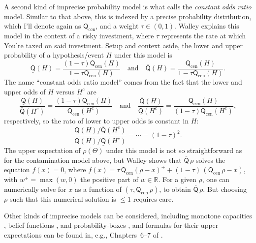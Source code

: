 \documentclass[a4paper, 12pt]{article}
\theoremstyle{plain}
\theoremstyle{definition}
\theoremstyle{remark}
\newcommand{\RR}{\mathbb{R}}
\newcommand{\TT}{\mathbb{T}}
\newcommand{\prior}{\mathsf{Q}}
\newcommand{\lprior}{\underline{\mathsf{Q}}}
\newcommand{\uprior}{\overline{\mathsf{Q}}}
\begin{document}
A second kind of imprecise probability model is what \citet[][Sec.~2.9.4]{walley1991} calls the {\em constant odds ratio} model.  Similar to that above, this is indexed by a precise probability distribution, which I'll denote again as $\prior_\text{cen}$, and a weight $\tau \in (0,1)$.  Walley explains this model in the context of a risky investment, where $\tau$ represents the rate at which You're taxed on said investment.  Setup and context aside, the lower and upper probability of a hypothesis/event $H$ under this model is 
\[ \lprior(H) = \frac{(1-\tau) \prior_\text{cen}(H)}{1 - \tau \prior_\text{cen}(H)} \quad \text{and} \quad \uprior(H) = \frac{\prior_\text{cen}(H)}{1-\tau \prior_\text{cen}(H)}. \]
The name ``constant odds ratio model'' comes from the fact that the lower and upper odds of $H$ versus $H^c$ are 
\[ \frac{\lprior(H)}{\uprior(H^c)} = \frac{(1-\tau) \prior_\text{cen}(H)}{\prior_\text{cen}(H^c)} \quad \text{and} \quad \frac{\uprior(H)}{\lprior(H^c)} = \frac{\prior_\text{cen}(H)}{(1-\tau)\prior_\text{cen}(H^c)}, \]
respectively, so the rato of lower to upper odds is constant in $H$:
\[ \frac{\lprior(H) / \uprior(H^c)}{\uprior(H) / \lprior(H^c)} = \cdots = (1-\tau)^2. \]
The upper expectation of $\rho(\Theta)$ under this model is not so straightforward as for the contamination model above, but Walley shows that $\uprior\,\rho$ solves the equation $f(x)=0$, where $f(x) = \tau \, \prior_\text{cen}(\rho - x)^+  + (1-\tau) \, ( \prior_\text{cen}\,\rho - x )$, with $w^+ = \max(w, 0)$ the positive part of $w \in \RR$.  For a given $\rho$, one can numerically solve for $x$ as a function of $(\tau, \prior_\text{cen}\,\rho)$, to obtain $\uprior\,\rho$.  But choosing $\rho$ such that this numerical solution is $\leq 1$ requires care. 

Other kinds of imprecise models can be considered, including monotone capacities \citep[e.g.,][]{huber1973.capacity, wasserman.kadane.1990, sundberg.wagner.1992}, belief functions \citep[e.g.,][]{denoeux1999, shafer1976, dempster1967}, and probability-boxes \citep[e.g.,][]{destercke.etal.pbox, ferson.etal.pbox}, and formulas for their upper expectations can be found in, e.g., Chapters~6--7 of \citet{lower.previsions.book}.  

\end{document}
